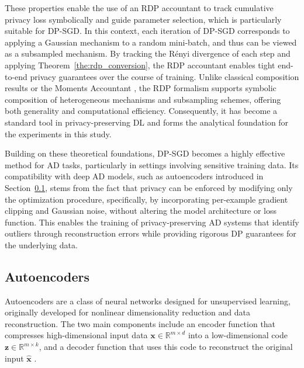 These properties enable the use of an RDP accountant to track cumulative privacy loss symbolically and guide parameter selection, which is particularly suitable for DP-SGD. In this context, each iteration of DP-SGD corresponds to applying a Gaussian mechanism to a random mini-batch, and thus can be viewed as a subsampled mechanism. By tracking the Rényi divergence of each step and applying Theorem~\ref{the:rdp_conversion}, the RDP accountant enables tight end-to-end privacy guarantees over the course of training. Unlike classical composition results or the Moments Accountant \citep{abadi2016deep}, the RDP formalism supports symbolic composition of heterogeneous mechanisms and subsampling schemes, offering both generality and computational efficiency. Consequently, it has become a standard tool in privacy-preserving DL and forms the analytical foundation for the experiments in this study.

Building on these theoretical foundations, DP-SGD becomes a highly effective method for AD tasks, particularly in settings involving sensitive training data. Its compatibility with deep AD models, such as autoencoders introduced in Section~\ref{s:background_ae}, stems from the fact that privacy can be enforced by modifying only the optimization procedure, specifically, by incorporating per-example gradient clipping and Gaussian noise, without altering the model architecture or loss function. This enables the training of privacy-preserving AD systems that identify outliers through reconstruction errors while providing rigorous DP guarantees for the underlying data.

\subsection{Autoencoders} \label{s:background_ae}

Autoencoders are a class of neural networks designed for unsupervised learning, originally developed for nonlinear dimensionality reduction and data reconstruction. The two main components include an encoder function that compresses high-dimensional input data $\mathbf{x} \in \mathbb{R}^{m \times d}$ into a low-dimensional code $\mathbf{z} \in \mathbb{R}^{m \times k}$, and a decoder function that uses this code to reconstruct the original input $\hat{\mathbf{x}}$ \citep{hinton2006reducing, sakurada2014anomaly}.


